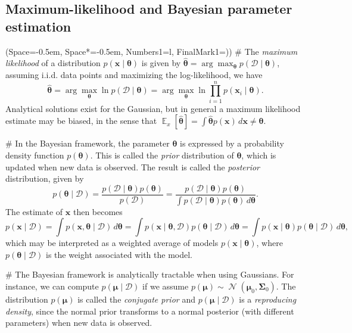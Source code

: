 \documentclass[12pt, a4paper]{article}
\newcommand{\listSpace}{-0.5em}%
\newcommand{\D}{\mathcal{D}}
\newcommand{\vect}[1]{\bm{#1}}
\DeclareMathOperator{\N}{\mathcal{N}}
\DeclareMathOperator{\E}{\mathbb{E}}
\begin{document}
\subsection{Maximum-likelihood and Bayesian parameter estimation}
\begin{easylist}[itemize]
\ListProperties(Space=\listSpace, Space*=\listSpace, Numbers1=l, FinalMark1={)})
# The \emph{maximum likelihood} of a distribution $p(\vect{x} \mid \vect{\theta})$ is given by $\hat{\vect{\theta}} = \arg \max_{\vect{\theta}} p(\D \mid \vect{\theta})$,
assuming i.i.d. data points and maximizing the log-likelihood, we have
\begin{equation*}
	\hat{\vect{\theta}} = \arg \max_{\vect{\theta}} \ln  p(\D \mid \vect{\theta}) = \arg \max_{\vect{\theta}}  \ln  \prod_{i=1}^{n} p(\vect{x}_i \mid \vect{\theta})  .
\end{equation*}
Analytical solutions exist for the Gaussian, but in general a maximum likelihood estimate may be biased, in the sense that $\E_x[ \hat{\vect{\theta}} ] = \int \hat{\vect{\theta}} p(\vect{x}) \, d\vect{x} \neq \vect{\theta}$.

# In the Bayesian framework, the parameter $\vect{\theta}$ is expressed by a probability density function $p(\vect{\theta})$.
This is called the \emph{prior} distribution of $\vect{\theta}$, which is updated when new data is observed.
The result is called the \emph{posterior} distribution, given by
\begin{equation*}
	p(\vect{\theta} \mid \D)  
	= 
	\frac{p(\D \mid \vect{\theta}) p (\vect{\theta})}
	{p(\D)}
	= 
	\frac{p(\D \mid \vect{\theta}) p (\vect{\theta})}
	{\int p(\D \mid \vect{\theta}) p(\vect{\theta}) \, d \vect{\theta}}.
\end{equation*}
The estimate of $\vect{x}$ then becomes
\begin{equation*}
	p(\vect{x} \mid \D) = \int p(\vect{x}, \vect{\theta} \mid \D) \, d\vect{\theta} =
	\int p(\vect{x} \mid \vect{\theta} , \D) p(\vect{\theta} \mid \D)  \, d\vect{\theta} =
	\int p(\vect{x} \mid \vect{\theta}) p(\vect{\theta} \mid \D)  \, d\vect{\theta},
\end{equation*}
which may be interpreted as a weighted average of models $p(\vect{x} \mid \vect{\theta})$, where $p(\vect{\theta} \mid \D)$ is the weight associated with the model.

# The Bayesian framework is analytically tractable when using Gaussians.
For instance, we can compute $p(\vect{\mu} \mid \D)$ if we assume $p(\vect{\mu}) \sim \N(\vect{\mu}_0, \vect{\Sigma}_0)$.
The distribution $p(\vect{\mu})$ is called the \emph{conjugate prior} and $p(\vect{\mu} \mid \D)$ is a \emph{reproducing density}, since the normal prior transforms to a normal posterior (with different parameters) when new data is observed.


\end{easylist}
\end{document}
